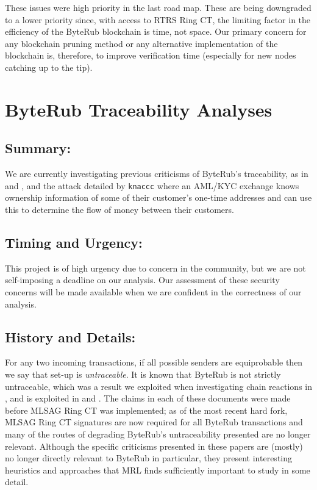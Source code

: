 \documentclass[12pt,english]{mrl}
\theoremstyle{definition}
\numberwithin{equation}{section}
\numberwithin{figure}{section}
\numberwithin{equation}{section}
\numberwithin{equation}{section}
\numberwithin{figure}{section}
\begin{document}
These issues were high priority in the last road map. These are being downgraded to a lower priority since, with access to RTRS Ring CT, the limiting factor in the efficiency of the ByteRub blockchain is time, not space. Our primary concern for any blockchain pruning method or any alternative implementation of the blockchain is, therefore, to improve verification time (especially for new nodes catching up to the tip).



\section{ByteRub Traceability Analyses}

\subsection{Summary:} 

We are currently investigating previous criticisms of ByteRub's traceability, as in \cite{miller2017empirical} and \cite{kumar2017traceability}, and the attack detailed by \texttt{knaccc}  where an AML/KYC exchange knows ownership information of some of their customer's one-time addresses and can use this to determine the flow of money between their customers.

\subsection{Timing and Urgency:} 

This project is of high urgency due to concern in the community, but we are not self-imposing a deadline on our analysis. Our assessment of these security concerns will be made available when we are confident in the correctness of our analysis.

\subsection{History and Details:} 

For any two incoming transactions, if all possible senders are equiprobable then we say that set-up is \textit{untraceable}. It is known that ByteRub is not strictly untraceable, which was a result we exploited when investigating chain reactions in \cite{noether2014note}, and is exploited in \cite{miller2017empirical} and \cite{kumar2017traceability}. The claims in each of these documents were made before MLSAG Ring CT was implemented; as of the most recent hard fork, MLSAG Ring CT signatures are now required for all ByteRub transactions and many of the routes of degrading ByteRub's untraceability presented are no longer relevant. Although the specific criticisms presented in these papers are (mostly) no longer directly relevant to ByteRub in particular, they present interesting heuristics and approaches that MRL finds sufficiently important to study in some detail.
\end{document}
